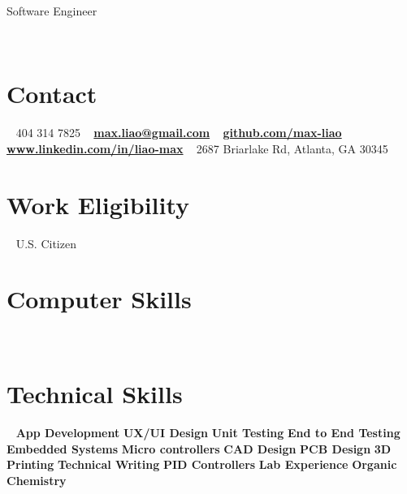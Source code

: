 \documentclass[]{resume}
\begin{document}
{Software Engineer}\\

\begin{aside}
	~
	~
	~
	~
	~
	\section{Contact}
	~
	404 314 7825
	~
	\href{mailto:max.liao@gmail.com}{\textbf{max.liao@gmail.com}}
	~
	\href{github.com/max-liao}{\textbf{github.com/max-liao}}
	~
	\href{www.linkedin.com/in/liao-max}{\textbf{\scriptsize www.linkedin.com/in/liao-max}}
	~
	{\small 2687 Briarlake Rd, Atlanta, GA 30345}
	~
	\section{\large Work Eligibility}
	~
	U.S. Citizen
	~
	\section{\large Computer Skills}
	~
	~
	\section{\large Technical Skills}
	~
	\textbf{App Development}
	\textbf{UX/UI Design}
	\textbf{Unit Testing}
	\textbf{End to End Testing}
	\textbf{Embedded Systems}
	\textbf{Micro controllers}
	\textbf{CAD Design}
	\textbf{PCB Design}
	\textbf{3D Printing}
	\textbf{Technical Writing}
	\textbf{PID Controllers}
	\textbf{Lab Experience}
	\textbf{Organic Chemistry}
\end{aside}
\end{document}
